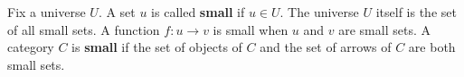 Fix a universe $U$. A set $u$ is called \textbf{small} if $u \in U$. The universe $U$ itself is the set of all small sets. A function $f: u \rightarrow v$ is small when $u$ and $v$ are small sets. A category $C$ is \textbf{small} if the set of objects of $C$ and the set of arrows of $C$ are both small sets.